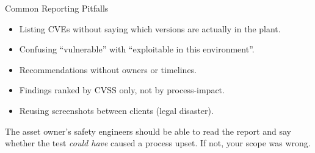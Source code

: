 \documentclass[aspectratio=169,11pt]{beamer}
\begin{document}
\begin{frame}{Common Reporting Pitfalls}
\begin{itemize}
  \item Listing CVEs without saying which versions are actually in the plant.
  \item Confusing ``vulnerable'' with ``exploitable in this environment''.
  \item Recommendations without owners or timelines.
  \item Findings ranked by CVSS only, not by process-impact.
  \item Reusing screenshots between clients (legal disaster).
\end{itemize}
\begin{warnbox}
The asset owner's safety engineers should be able to read the report and say whether the test \emph{could have} caused a process upset. If not, your scope was wrong.
\end{warnbox}
\end{frame}
\end{document}
